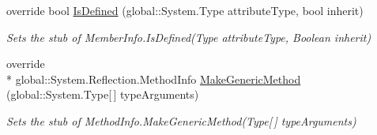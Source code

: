 \begin{DoxyCompactItemize}
override bool \hyperlink{class_system_1_1_reflection_1_1_fakes_1_1_stub_method_info_ad9e220cc6233d010185e5753babc9d17}{Is\-Defined} (global\-::\-System.\-Type attribute\-Type, bool inherit)
\begin{DoxyCompactList}\small\item\em Sets the stub of Member\-Info.\-Is\-Defined(\-Type attribute\-Type, Boolean inherit)\end{DoxyCompactList}\item 
override \\*
global\-::\-System.\-Reflection.\-Method\-Info \hyperlink{class_system_1_1_reflection_1_1_fakes_1_1_stub_method_info_a4de2b5d4d381239f7643e6f2e876905a}{Make\-Generic\-Method} (global\-::\-System.\-Type\mbox{[}$\,$\mbox{]} type\-Arguments)
\begin{DoxyCompactList}\small\item\em Sets the stub of Method\-Info.\-Make\-Generic\-Method(\-Type\mbox{[}$\,$\mbox{]} type\-Arguments)\end{DoxyCompactList}\end{DoxyCompactItemize}

